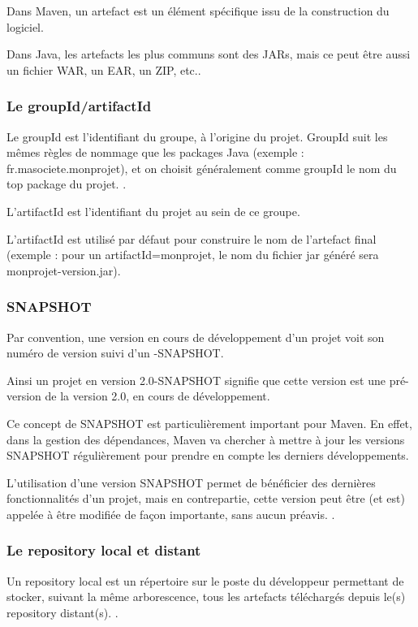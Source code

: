  Dans Maven, un artefact est un élément spécifique issu de la construction du logiciel. 
 
 Dans Java, les artefacts les plus communs sont des JARs, mais ce peut être aussi un fichier WAR, un EAR, un ZIP, etc.\parencite{maven}.

  
 
     \subsubsection{Le groupId/artifactId }
   Le groupId est l'identifiant du groupe, à l'origine du projet. GroupId suit les mêmes règles de nommage que les packages  Java (exemple : fr.masociete.monprojet), et on choisit généralement comme groupId le nom du top package du projet. \parencite{maven}.
   
   L'artifactId est l'identifiant du projet au sein de ce groupe. 
   
   L'artifactId est utilisé par défaut pour construire le nom de l'artefact final (exemple : pour un artifactId=monprojet, le nom du fichier jar généré sera monprojet-version.jar).  \subsubsection{  SNAPSHOT  }
 
    Par convention, une version en cours de développement d'un projet voit son numéro de version suivi d'un -SNAPSHOT. 
    
    Ainsi un projet en version 2.0-SNAPSHOT signifie que cette version est une pré-version de la version 2.0, en cours de développement. 
    
    Ce concept de SNAPSHOT est particulièrement important pour Maven. En effet, dans la gestion des dépendances, Maven va chercher à mettre à jour les versions SNAPSHOT régulièrement pour prendre en compte les derniers développements. 
    
    L'utilisation d'une version SNAPSHOT permet de bénéficier des dernières fonctionnalités d'un projet, mais en contrepartie, cette version peut être (et est) appelée à être modifiée de façon importante, sans aucun préavis. \parencite{maven}.
       \subsubsection{Le repository local et distant }
    Un repository local est un répertoire sur le poste du développeur permettant de stocker, suivant la même arborescence, tous les artefacts téléchargés depuis le(s) repository distant(s). \parencite{maven}. 
    
